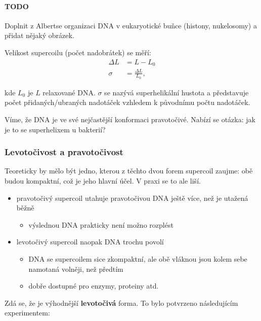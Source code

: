 \documentclass[DIV=8]{scrreprt}
\newcommand{\mybox}[2]{
    \paragraph{#1} #2
}
\begin{document}
\mybox{TODO}{Doplnit z Albertse organizaci DNA v eukaryotické buňce (histony, nukelosomy) a přidat nějaký obrázek.}


Velikost supercoilu (počet nadobrátek) se měří:
\begin{align*}\Delta L &= L - L_0 \\
\sigma &= \frac{\Delta L}{L_0},\end{align*}

kde \(L_0\) je \(L\) relaxované DNA. \(\sigma\) se nazývá superhelikální hustota a představuje počet přidaných/ubraných nadotáček vzhledem k původnímu počtu nadotáček.

Víme, že DNA je ve své nejčastější konformaci pravotočivé. Nabízí se otázka: jak je to se superhelixem u bakterií?

\subsubsection{Levotočivost a pravotočivost} \label{Levotočivost a pravotočivost}


Teoreticky by mělo být jedno, kterou z těchto dvou forem supercoil zaujme: obě budou kompaktní, což je jeho hlavní účel. V praxi se to ale liší.
\begin{itemize}[nosep]
    \item pravotočivý supercoil utahuje pravotočivou DNA ještě více, než je utažená běžně
\begin{itemize}[nosep]
    \item výslednou DNA prakticky není možno rozplést
\end{itemize}

    \item levotočivý supercoil naopak DNA trochu povolí
\begin{itemize}[nosep]
    \item DNA se supercoilem sice zkompaktní, ale obě vláknou jsou kolem sebe namotaná volněji, než předtím
    \item dobře dostupné pro enzymy, proteiny atd.
\end{itemize}

\end{itemize}



Zdá se, že je výhodnější \textbf{levotočivá} forma. To bylo potvrzeno následujícím experimentem:
\end{document}
